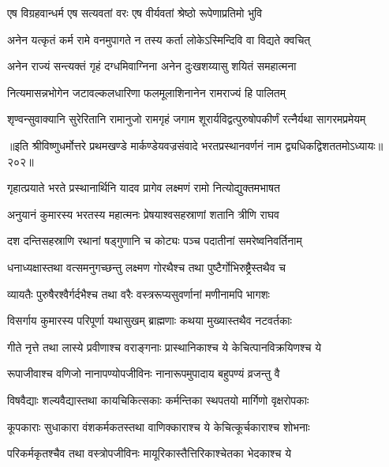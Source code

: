 \twolineshloka
{एष विग्रहवान्धर्म एष सत्यवतां वरः}
{एष वीर्यवतां श्रेष्ठो रूपेणाप्रतिमो भुवि}%

\twolineshloka
{अनेन यत्कृतं कर्म रामे वनमुपागते}
{न तस्य कर्ता लोकेऽस्मिन्दिवि वा विद्यते क्वचित्}%

\twolineshloka
{अनेन राज्यं सन्त्यक्तं गृहं दग्धमिवाग्निना}
{अनेन दुःखशय्यासु शयितं समहात्मना}%

\twolineshloka
{नित्यमासन्नभोगेन जटावल्कलधारिणा}
{फलमूलाशिनानेन रामराज्यं हि पालितम्}%

\twolineshloka
{शृण्वन्सुवाक्यानि सुरेरितानि रामानुजो रामगृहं जगाम}
{शूरार्यविद्वत्पुरुषोपकीर्णं रत्नैर्यथा सागरमप्रमेयम्}%

॥इति श्रीविष्णुधर्मोत्तरे प्रथमखण्डे मार्कण्डेयवज्रसंवादे भरतप्रस्थानवर्णनं नाम द्व्यधिकद्विशततमोऽध्यायः॥२०२॥



\twolineshloka
{गृहात्प्रयाते भरते प्रस्थानार्थिनि यादव}
{प्रागेव लक्ष्मणं रामो नित्योद्युक्तमभाषत}%

\twolineshloka
{अनुयानं कुमारस्य भरतस्य महात्मनः}
{प्रेषयाश्वसहस्राणां शतानि त्रीणि राघव}%

\twolineshloka
{दश दन्तिसहस्राणि रथानां षड्गुणानि च}
{कोट्यः पञ्च पदातीनां समरेष्वनिवर्तिनाम्}%

\twolineshloka
{धनाध्यक्षास्तथा वत्समनुगच्छन्तु लक्ष्मण}
{गोरथैश्च तथा पुष्टैर्गोभिरुष्ट्रैस्तथैव च}%

\twolineshloka
{व्यायतैः पुरुषैरश्वैर्गर्दभैश्च तथा वरैः}
{वस्त्ररूप्यसुवर्णानां मणीनामपि भागशः}%

\twolineshloka
{विसर्गाय कुमारस्य परिपूर्णा यथासुखम्}
{ब्राह्मणाः कथया मुख्यास्तथैव नटवर्तकाः}%

\twolineshloka
{गीते नृत्ते तथा लास्ये प्रवीणाश्च वराङ्गनाः}
{प्रास्थानिकाश्च ये केचित्पानविक्रयिणश्च ये}%

\twolineshloka
{रूपाजीवाश्च वणिजो नानापण्योपजीविनः}
{नानारूपमुपादाय बहुपण्यं व्रजन्तु वै}%

\twolineshloka
{विषवैद्याः शल्यवैद्यास्तथा कायचिकित्सकाः}
{कर्मन्तिका स्थपतयो मार्गिणो वृक्षरोपकाः}%

\twolineshloka
{कूपकाराः सुधाकारा वंशकर्मकतस्तथा}
{वाणिक्काराश्च ये केचित्कूर्चकाराश्च शोभनाः} %

\twolineshloka
{परिकर्मकृतश्चैव तथा वस्त्रोपजीविनः}
{मायूरिकास्तैत्तिरिकाश्चेतका भेदकाश्च ये}%

